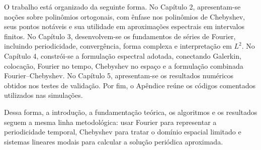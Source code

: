 O trabalho está organizado da seguinte forma. No Capítulo 2, apresentam-se noções sobre polinômios ortogonais, com ênfase nos polinômios de Chebyshev, seus pontos notáveis e sua utilidade em aproximações espectrais em intervalos finitos. No Capítulo 3, desenvolvem-se os fundamentos de séries de Fourier, incluindo periodicidade, convergência, forma complexa e interpretação em \(L^2\). No Capítulo 4, constrói-se a formulação espectral adotada, conectando Galerkin, colocação, Fourier no tempo, Chebyshev no espaço e a formulação combinada Fourier--Chebyshev. No Capítulo 5, apresentam-se os resultados numéricos obtidos nos testes de validação. Por fim, o Apêndice reúne os códigos comentados utilizados nas simulações.

Dessa forma, a introdução, a fundamentação teórica, os algoritmos e os resultados seguem a mesma linha metodológica: usar Fourier para representar a periodicidade temporal, Chebyshev para tratar o domínio espacial limitado e sistemas lineares modais para calcular a solução periódica aproximada.
